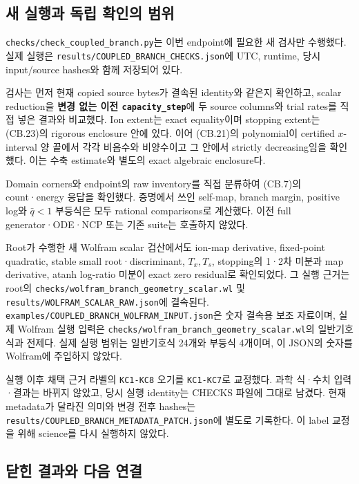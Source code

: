\hypertarget{uxc0c8-uxc2e4uxd589uxacfc-uxb3c5uxb9bd-uxd655uxc778uxc758-uxbc94uxc704}{%
\subsection{새 실행과 독립 확인의 범위}\label{uxc0c8-uxc2e4uxd589uxacfc-uxb3c5uxb9bd-uxd655uxc778uxc758-uxbc94uxc704}}

\nolinkurl{checks/check_coupled_branch.py}는 이번 endpoint에 필요한 새 검사만 수행했다. 실제 실행은 \nolinkurl{results/COUPLED_BRANCH_CHECKS.json}에 UTC, runtime, 당시 input/source hashes와 함께 저장되어 있다.

검사는 먼저 현재 copied source bytes가 결속된 identity와 같은지 확인하고, scalar reduction을 \textbf{변경 없는 이전 \texttt{capacity\_step}}에 두 source columns와 trial rates를 직접 넣은 결과와 비교했다. Ion extent는 exact equality이며 stopping extent는 (CB.23)의 rigorous enclosure 안에 있다. 이어 (CB.21)의 polynomial이 certified \(x\)-interval 양 끝에서 각각 비음수와 비양수이고 그 안에서 strictly decreasing임을 확인했다. 이는 수축 estimate와 별도의 exact algebraic enclosure다.

Domain corners와 endpoint의 raw inventory를 직접 분류하여 (CB.7)의 count·energy 응답을 확인했다. 증명에서 쓰인 self-map, branch margin, positive log와 \(\bar q<1\) 부등식은 모두 rational comparisons로 계산했다. 이전 full generator·ODE·NCP 또는 기존 suite는 호출하지 않았다.

Root가 수행한 새 Wolfram scalar 검산에서도 ion-map derivative, fixed-point quadratic, stable small root·discriminant, \(T_x,T_s\), stopping의 1·2차 미분과 map derivative, atanh log-ratio 미분이 exact zero residual로 확인되었다. 그 실행 근거는 root의 \nolinkurl{checks/wolfram_branch_geometry_scalar.wl} 및 \nolinkurl{results/WOLFRAM_SCALAR_RAW.json}에 결속된다. \nolinkurl{examples/COUPLED_BRANCH_WOLFRAM_INPUT.json}은 숫자 결속용 보조 자료이며, 실제 Wolfram 실행 입력은 \nolinkurl{checks/wolfram_branch_geometry_scalar.wl}의 일반기호식과 전제다. 실제 실행 범위는 일반기호식 24개와 부등식 4개이며, 이 JSON의 숫자를 Wolfram에 주입하지 않았다.

실행 이후 채택 근거 라벨의 \texttt{KC1-KC8} 오기를 \texttt{KC1-KC7}로 교정했다. 과학 식·수치 입력·결과는 바뀌지 않았고, 당시 실행 identity는 CHECKS 파일에 그대로 남겼다. 현재 metadata가 달라진 의미와 변경 전후 hashes는 \texttt{results/COUPLED\_BRANCH\_METADATA\_PATCH.json}에 별도로 기록한다. 이 label 교정을 위해 science를 다시 실행하지 않았다.

\hypertarget{uxb2ebuxd78c-uxacb0uxacfcuxc640-uxb2e4uxc74c-uxc5f0uxacb0}{%
\subsection{닫힌 결과와 다음 연결}\label{uxb2ebuxd78c-uxacb0uxacfcuxc640-uxb2e4uxc74c-uxc5f0uxacb0}}

